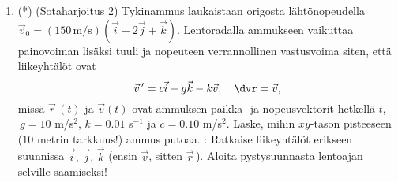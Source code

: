 \begin{enumerate}
\item (*) 
(Sotaharjoitus 2) Tykinammus laukaistaan origosta lähtönopeudella 
$\vec v_0=(150\,\text{m}/\text{s})(\vec i+2\vec j+\vec k)$. Lentoradalla ammukseen vaikuttaa 
painovoiman lisäksi tuuli ja nopeuteen verrannollinen vastusvoima siten, että liikeyhtälöt
ovat
\[
\vec v\,'=c\vec i-g\vec k-k\vec v, \quad \dvr=\vec v,
\]
missä $\vec r\,(t)$ ja $\vec v(t)$ ovat ammuksen paikka- ja nopeusvektorit hetkellä $t$,
$\,g=10$ m/s$^2$, $k=0.01$ s$^{-1}$ ja $c=0.10$ m/s$^2$. Laske, mihin $xy$-tason pisteeseen
($10$ metrin tarkkuus!) ammus putoaa. : Ratkaise liikeyhtälöt erikseen suunnissa
$\vec i,\,\vec j,\,\vec k$ (ensin $\vec v$, sitten $\vec r\,$). Aloita pystysuunnasta lentoajan
selville saamiseksi! 

\end{enumerate}